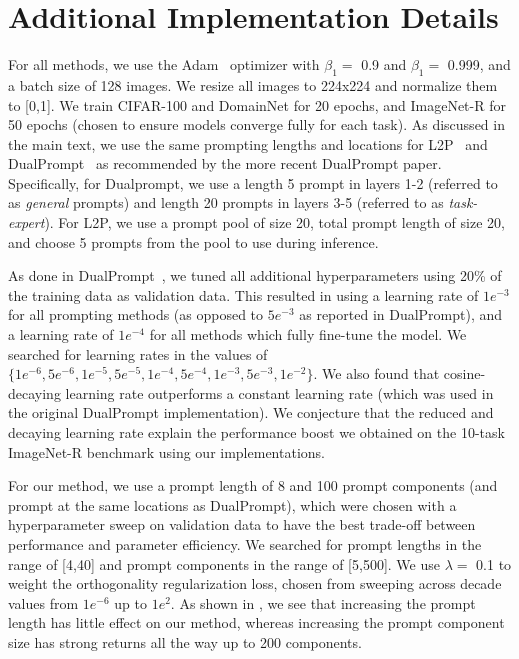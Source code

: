 \section{Additional Implementation Details}
\label{appendix-details}


For all methods, we use the Adam~\cite{kingma2014adam} optimizer with $\beta_1 =$ 0.9 and $\beta_1 = $ 0.999, and a batch size of 128 images. We resize all images to 224x224 and normalize them to [0,1]. We train CIFAR-100 and DomainNet for 20 epochs, and ImageNet-R for 50 epochs (chosen to ensure models converge fully for each task). As discussed in the main text, we use the same prompting lengths and locations for L2P~\cite{wang2022learning} and DualPrompt~\cite{wang2022dualprompt} as recommended by the more recent DualPrompt paper. Specifically, for Dualprompt, we use a length 5 prompt in layers 1-2 (referred to as \emph{general} prompts) and length 20 prompts in layers 3-5 (referred to as \emph{task-expert}). For L2P, we use a prompt pool of size 20, total prompt length of size 20, and choose 5 prompts from the pool to use during inference.

As done in DualPrompt~\cite{wang2022dualprompt}, we tuned all additional hyperparameters using 20\% of the training data as validation data. This resulted in using a learning rate of $1e^{-3}$ for all prompting methods (as opposed to $5e^{-3}$ as reported in DualPrompt), and a learning rate of $1e^{-4}$ for all methods which fully fine-tune the model. We searched for learning rates in the values of $\{1e^{-6},5e^{-6},1e^{-5},5e^{-5},1e^{-4},5e^{-4},1e^{-3},5e^{-3},1e^{-2}\}$. We also found that cosine-decaying learning rate outperforms a constant learning rate (which was used in the original DualPrompt implementation). We conjecture that the reduced and decaying learning rate explain the performance boost we obtained on the 10-task ImageNet-R benchmark using our implementations.

For our method, we use a prompt length of 8 and 100 prompt components (and prompt at the same locations as DualPrompt), which were chosen with a hyperparameter sweep on validation data to have the best trade-off between performance and parameter efficiency. We searched for prompt lengths in the range of [4,40] and prompt components in the range of [5,500]. We use $\lambda = $ 0.1 to weight the orthogonality regularization loss, chosen from sweeping across decade values from $1e^{-6}$ up to $1e^2$. As shown in \AppA{}, we see that increasing the prompt length has little effect on our method, whereas increasing the prompt component size has strong returns all the way up to 200 components.

